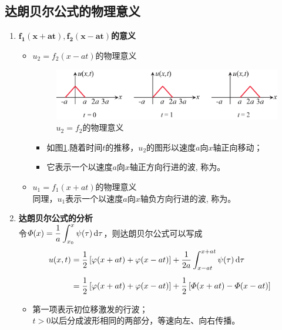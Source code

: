 \subsection{达朗贝尔公式的物理意义}
\begin{enumerate}[1.]
	\item $\bm{f_1(x + at), f_2(x - at)}$\textbf{的意义}
	\begin{itemize}
		\item $u_2 = f_2(x - at)$的物理意义
		\begin{figure}[!htb]
			\centering
			\includegraphics[width=0.7\linewidth]{pic/行波物理意义.pdf}
			\vspace*{-1em}
			\caption{$u_2 = f_2$的物理意义}
			\vspace*{-1em}
			\label{行波物理意义}
		\end{figure}
		\begin{itemize}
			\item 如图\ref{行波物理意义}.随着时间$t$的推移，$u_2$的图形以速度$a$向$x$轴正向移动；
			\item 它表示一个以速度$a$向$x$轴正方向行进的波, 称为。
		\end{itemize}
		\item $u_1 = f_1(x + at)$的物理意义\\
		\hspace*{2em}同理，$u_1$表示一个以速度$a$向$x$轴负方向行进的波, 称为。
	\end{itemize}
	\vspace*{1em}

	\item \textbf{达朗贝尔公式的分析}\\[0.5em]
	令$\varPhi(x) = \dfrac{1}{a} \displaystyle \int_{x_0}^{x} \psi(\tau) \, {\rm{d}} \tau$，则达朗贝尔公式可以写成\vspace*{-0.5em}
	\begin{align}
		u(x,t) &= \dfrac{1}{2}\left[\varphi(x+at) + \varphi(x -at)\right] + \dfrac{1}{2a} \int_{x - at}^{x + at}\psi(\tau) \, {\rm{d}} \tau \notag \\[0.5em]
		& = \dfrac{1}{2}\left[\varphi(x+at) + \varphi(x -at)\right] + \dfrac{1}{2}\left[\varPhi(x+at) - \varPhi(x -at) \right]
	\end{align}
	\begin{itemize}
		\item 第一项表示初位移激发的行波；\\
		\hspace*{2em} $t > 0$以后分成波形相同的两部分，等速向左、向右传播。
		

\end{itemize}
\end{enumerate}
